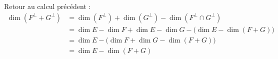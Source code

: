Retour au calcul précédent :
\begin{align*}
	\dim(F^{\perp} + G^{\perp}) &= \dim(F^{\perp}) + \dim(G^{\perp}) - \dim(F^{\perp} \cap G^{\perp}) \\
	&= \dim E - \dim F + \dim E - \dim G - \big(\dim E - \dim(F+G)\big) \\
	&= \dim E - \big(\dim F + \dim G - \dim (F+G)\big) \\
	&= \dim E - \dim(F + G) \\
\end{align*}

